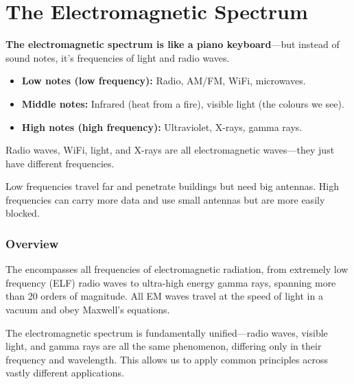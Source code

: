 
\chapter{The Electromagnetic Spectrum}
\label{ch:spectrum}

\begin{nontechnical}
    \textbf{The electromagnetic spectrum is like a piano keyboard}---but instead of sound notes, it's frequencies of light and radio waves.

    \begin{itemize}
        \item \textbf{Low notes (low frequency):} Radio, AM/FM, WiFi, microwaves.
        \item \textbf{Middle notes:} Infrared (heat from a fire), visible light (the colours we see).
        \item \textbf{High notes (high frequency):} Ultraviolet, X-rays, gamma rays.
    \end{itemize}

     Radio waves, WiFi, light, and X-rays are all electromagnetic waves---they just have different frequencies.

     Low frequencies travel far and penetrate buildings but need big antennas. High frequencies can carry more data and use small antennas but are more easily blocked.
\end{nontechnical}

\subsection{Overview}

The  encompasses all frequencies of electromagnetic radiation, from extremely low frequency (ELF) radio waves to ultra-high energy gamma rays, spanning more than 20 orders of magnitude. All EM waves travel at the speed of light in a vacuum and obey Maxwell's equations.

\begin{keyconcept}
    The electromagnetic spectrum is fundamentally unified---radio waves, visible light, and gamma rays are all the same phenomenon, differing only in their frequency and wavelength. This allows us to apply common principles across vastly different applications.
\end{keyconcept}

